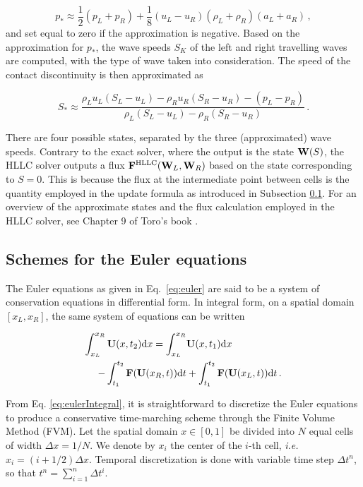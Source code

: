 \documentclass[final,3p,twocolumn]{elsarticle}
\begin{document}
\begin{equation}
    p_* \approx \frac{1}{2}(p_L+p_R) 
    +\frac{1}{8}(u_L-u_R)(\rho_L+\rho_R)(a_L+a_R) \,,
    \label{eq:pressureHLLC}
\end{equation}
%
and set equal to zero if the approximation is negative. Based on the
approximation for $p_*$, the wave speeds $S_K$ of the left and right travelling
waves are computed, with the type of wave taken into consideration. The speed
of the contact discontinuity is then approximated as

\begin{equation}
    S_* \approx \frac{\rho_L u_L(S_L-u_L)-\rho_R
    u_R(S_R-u_R)-(p_L-p_R)}{\rho_L(S_L-u_L)-\rho_R(S_R-u_R)} \,.
    \label{eq:speedHLLC}
\end{equation}

There are four possible states, separated by the three (approximated) wave
speeds.  Contrary to the exact solver, where the output is the state ${\bf
W}(S)$, the HLLC solver outputs a flux ${\bf F}^{\rm HLLC}({\bf W}_L, {\bf
W}_R)$ based on the state corresponding to $S=0$. This is because the flux at
the intermediate point between cells is the quantity employed in the update
formula as introduced in Subsection \ref{subsec:eulerschemes}. For an overview
of the approximate states and the flux calculation employed in the HLLC solver,
see Chapter 9 of Toro's book \cite{toro2013riemann}. 

\subsection{Schemes for the Euler equations}
\label{subsec:eulerschemes}

The Euler equations as given in Eq.\ \eqref{eq:euler} are said to be a system
of conservation equations in differential form. In integral form, on a spatial
domain $[x_L, x_R]$, the same system of equations can be written

\begin{align}
    \nonumber
    \int_{x_L}^{x_R} {\bf U}(x,t_2) {\rm d}x = 
    \int_{x_L}^{x_R} &{\bf U}(x,t_1) {\rm d}x \\ 
    -\int_{t_1}^{t_2} {\bf F}({\bf U}(x_R,t)) {\rm d}t 
    &+ \int_{t_1}^{t_2} {\bf F}({\bf U}(x_L,t)) {\rm d}t \,.
    \label{eq:eulerIntegral}
\end{align}

From Eq. \eqref{eq:eulerIntegral}, it is straightforward to discretize the
Euler equations to produce a conservative time-marching scheme through the
Finite Volume Method (FVM). Let the spatial domain $x \in [0,1]$ be divided
into $N$ equal cells of width $\Delta x = 1/N$.  We denote by $x_i$ the center
of the $i$-th cell, \emph{i.e.~} $x_i = (i+1/2)\Delta x$. 
%
Temporal discretization is done with variable time step $\Delta t^n$, so that
$t^n = \sum_{i=1}^n \Delta t^i$. 
\end{document}
